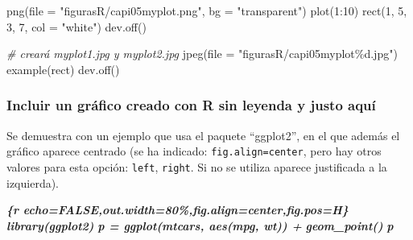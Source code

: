 \documentclass[12pt,a4paper,oneside,]{book}
\newenvironment{Shaded}{\begin{snugshade}}{\end{snugshade}}
\newcommand{\AttributeTok}[1]{\textcolor[rgb]{0.77,0.63,0.00}{#1}}
\newcommand{\CommentTok}[1]{\textcolor[rgb]{0.56,0.35,0.01}{\textit{#1}}}
\newcommand{\DecValTok}[1]{\textcolor[rgb]{0.00,0.00,0.81}{#1}}
\newcommand{\FunctionTok}[1]{\textcolor[rgb]{0.00,0.00,0.00}{#1}}
\newcommand{\InformationTok}[1]{\textcolor[rgb]{0.56,0.35,0.01}{\textbf{\textit{#1}}}}
\newcommand{\NormalTok}[1]{#1}
\newcommand{\SpecialCharTok}[1]{\textcolor[rgb]{0.00,0.00,0.00}{#1}}
\newcommand{\StringTok}[1]{\textcolor[rgb]{0.31,0.60,0.02}{#1}}
\numberwithin{dummy}{section}
\theoremstyle{ocrenumbox}
\theoremstyle{blacknumex}
\theoremstyle{blacknumbox}
\theoremstyle{ocrenum}
\theoremstyle{ocrenum}
\begin{document}
\begin{Shaded}
\begin{Highlighting}[]
\FunctionTok{png}\NormalTok{(}\AttributeTok{file =} \StringTok{"figurasR/capi05myplot.png"}\NormalTok{, }\AttributeTok{bg =} \StringTok{"transparent"}\NormalTok{)}
\FunctionTok{plot}\NormalTok{(}\DecValTok{1}\SpecialCharTok{:}\DecValTok{10}\NormalTok{)}
\FunctionTok{rect}\NormalTok{(}\DecValTok{1}\NormalTok{, }\DecValTok{5}\NormalTok{, }\DecValTok{3}\NormalTok{, }\DecValTok{7}\NormalTok{, }\AttributeTok{col =} \StringTok{"white"}\NormalTok{)}
\FunctionTok{dev.off}\NormalTok{()}
\end{Highlighting}
\end{Shaded}

\begin{Shaded}
\begin{Highlighting}[]
 \CommentTok{\# creará myplot1.jpg y myplot2.jpg}
\FunctionTok{jpeg}\NormalTok{(}\AttributeTok{file =} \StringTok{"figurasR/capi05myplot\%d.jpg"}\NormalTok{)}
\FunctionTok{example}\NormalTok{(rect)}
\FunctionTok{dev.off}\NormalTok{()}
\end{Highlighting}
\end{Shaded}

\hypertarget{incluir-un-gruxe1fico-creado-con-r-sin-leyenda-y-justo-aquuxed}{%
\subsubsection{Incluir un gráfico creado con R sin leyenda y justo
aquí}\label{incluir-un-gruxe1fico-creado-con-r-sin-leyenda-y-justo-aquuxed}}

Se demuestra con un ejemplo que usa el paquete ``ggplot2'', en el que
además el gráfico aparece centrado (se ha indicado:
\texttt{fig.align=\textquotesingle{}center\textquotesingle{}}, pero hay
otros valores para esta opción:
\texttt{\textquotesingle{}left\textquotesingle{}},
\texttt{\textquotesingle{}right\textquotesingle{}}. Si no se utiliza
aparece justificada a la izquierda).

\begin{Shaded}
\begin{Highlighting}[]
\InformationTok{\textasciigrave{}\textasciigrave{}\textasciigrave{}\{r echo=FALSE,out.width=\textquotesingle{}80\%\textquotesingle{},fig.align=\textquotesingle{}center\textquotesingle{},fig.pos=\textquotesingle{}H\textquotesingle{}\}}
\InformationTok{library(ggplot2)}
\InformationTok{p = ggplot(mtcars, aes(mpg, wt)) + }
\InformationTok{  geom\_point()}
\InformationTok{p  }
\InformationTok{\textasciigrave{}\textasciigrave{}\textasciigrave{}}
\end{Highlighting}
\end{Shaded}
\end{document}
